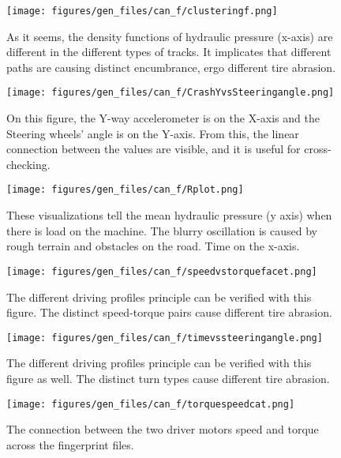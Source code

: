 		\begin{figure}[H]
			\centering
			\texttt{[image: figures/gen\_files/can\_f/clusteringf.png]}
			\caption{As it seems, the density functions of hydraulic pressure (x-axis) are different in the different types of tracks. It implicates that different paths are causing distinct encumbrance, ergo different tire abrasion.\label{implementation:pressure}} 
			\end{figure}
		\begin{figure}[H]
			\centering
			\texttt{[image: figures/gen\_files/can\_f/CrashYvsSteeringangle.png]}
			\caption{On this figure, the Y-way accelerometer is on the X-axis and the Steering wheels' angle is on the Y-axis. From this, the linear connection between the values are visible, and it is useful for cross-checking.\label{implementation:Crash}} 
			\end{figure}
		\begin{figure}[H]
			\centering
			\texttt{[image: figures/gen\_files/can\_f/Rplot.png]}
			\caption{These visualizations tell the mean hydraulic pressure (y axis) when there is load on the machine. The blurry oscillation is caused by rough terrain and obstacles on the road. Time on the x-axis.\label{implementation:loadon}} 
			\end{figure}		
		\begin{figure}[H]
			\centering
			\texttt{[image: figures/gen\_files/can\_f/speedvstorquefacet.png]}
			\caption{The different driving profiles principle can be verified with this figure. The distinct speed-torque pairs cause different tire abrasion.\label{implementation:svst}} 
			\end{figure}	
		\begin{figure}[H]
			\centering
			\texttt{[image: figures/gen\_files/can\_f/timevssteeringangle.png]}
			\caption{The different driving profiles principle can be verified with this figure as well. The distinct turn types cause different tire abrasion.\label{implementation:timevssteeringangle}} 
			\end{figure}	
		\begin{figure}[H]
			\centering
			\texttt{[image: figures/gen\_files/can\_f/torquespeedcat.png]}
			\caption{The connection between the two driver motors speed and torque across the fingerprint files.\label{implementation:tands}} 
			\end{figure}		
